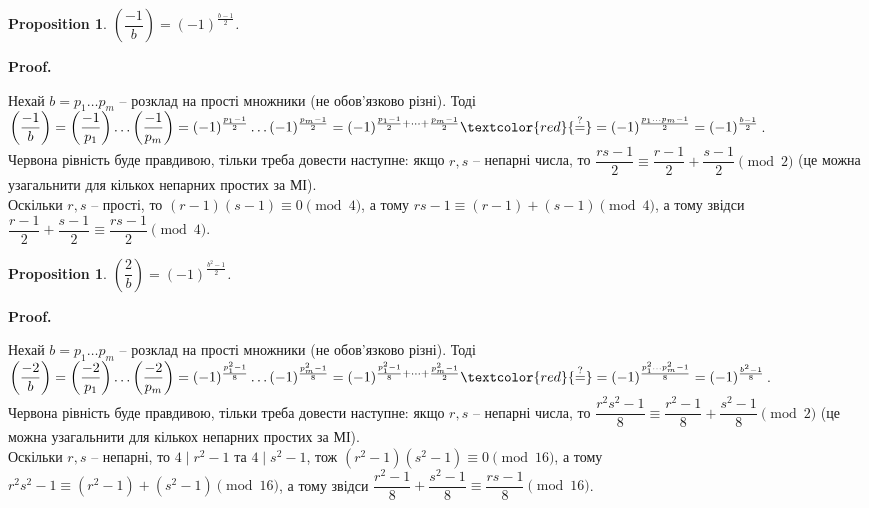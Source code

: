 \documentclass[a4paper, 10pt]{article}
\makeatletter
\theoremstyle{theoremdd}
\theoremstyle{theoremdd}
\theoremstyle{theoremdd}
\theoremstyle{theoremdd}
\theoremstyle{theoremdd}
\newtheorem{proposition}[theorem]{Proposition}
\theoremstyle{theoremdd}
\theoremstyle{theoremdd}
\theoremstyle{theoremdd}
\renewenvironment{proof}[1][Proof.\\]{\par
\pushQED{\hfill \qed}%
\normalfont \topsep6\p@\@plus6\p@\relax
\trivlist
\item\relax
{\bfseries
#1\@addpunct{.}}\hspace\labelsep\ignorespaces
}{%
\popQED\endtrivlist\@endpefalse
}
\makeatother
\begin{document}
\begin{proposition}
$\left( \dfrac{-1}{b} \right) = (-1)^{\frac{b-1}{2}}$.
\end{proposition}

\begin{proof}
Нехай $b = p_1 \dots p_m$ -- розклад на прості множники (не обов'язково різні). Тоді\\
$\left( \dfrac{-1}{b} \right) = \left( \dfrac{-1}{p_1} \right) \dots \left( \dfrac{-1}{p_m}\right) = (-1)^{\frac{p_1-1}{2}} \dots (-1)^{\frac{p_m-1}{2}} = (-1)^{\frac{p_1 -1}{2} + \dots + \frac{p_m -1}{2}} \textcolor{red}{\overset{?}{=}} \\ = (-1)^{\frac{p_1\dots p_m-1}{2}} = (-1)^{\frac{b-1}{2}}$.
\bigskip \\
Червона рівність буде правдивою, тільки треба довести наступне: якщо $r,s$ -- непарні числа, то $\dfrac{rs-1}{2} \equiv \dfrac{r-1}{2} + \dfrac{s-1}{2} \pmod 2$ (це можна узагальнити для кількох непарних простих за МІ).\\
Оскільки $r,s$ -- прості, то $(r-1)(s-1) \equiv 0 \pmod 4$, а тому $rs - 1 \equiv (r-1) + (s-1) \pmod {4}$, а тому звідси $\dfrac{r-1}{2} + \dfrac{s-1}{2} \equiv \dfrac{rs-1}{2} \pmod {4}$.
\end{proof}

\begin{proposition}
$\left( \dfrac{2}{b} \right) = (-1)^{\frac{b^2-1}{2}}$.
\end{proposition}

\begin{proof}
Нехай $b = p_1 \dots p_m$ -- розклад на прості множники (не обов'язково різні). Тоді\\
$\left( \dfrac{-2}{b} \right) = \left( \dfrac{-2}{p_1} \right) \dots \left( \dfrac{-2}{p_m}\right) = (-1)^{\frac{p^2_1-1}{8}} \dots (-1)^{\frac{p^2_m-1}{8}} = (-1)^{\frac{p^2_1 -1}{8} + \dots + \frac{p^2_m -1}{2}} \textcolor{red}{\overset{?}{=}} \\ = (-1)^{\frac{p^2_1\dots p^2_m-1}{8}} = (-1)^{\frac{b^2-1}{8}}$.
\bigskip \\
Червона рівність буде правдивою, тільки треба довести наступне: якщо $r,s$ -- непарні числа, то $\dfrac{r^2 s^2-1}{8} \equiv \dfrac{r^2-1}{8} + \dfrac{s^2-1}{8} \pmod 2$ (це можна узагальнити для кількох непарних простих за МІ).\\
Оскільки $r,s$ -- непарні, то $4 \mid r^2-1$ та $4 \mid s^2-1$, тож $(r^2-1)(s^2-1) \equiv 0 \pmod {16}$, а тому $r^2s^2 - 1 \equiv (r^2-1) + (s^2-1) \pmod {16}$, а тому звідси $\dfrac{r^2-1}{8} + \dfrac{s^2-1}{8} \equiv \dfrac{rs-1}{8} \pmod {16}$.
\end{proof}
\end{document}
